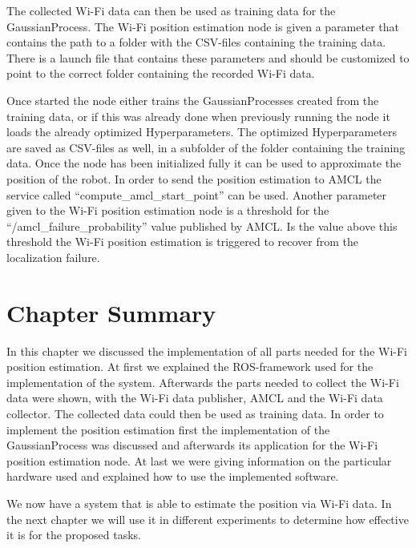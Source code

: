 The collected Wi-Fi data can then be used as training data for the \Gls{GaussianProcess}. The Wi-Fi position estimation node is given a parameter that contains the path to a folder with the CSV-files containing the training data. There is a launch file that contains these parameters and should be customized to point to the correct folder containing the recorded Wi-Fi data.

Once started the node either trains the \Gls{GaussianProcess}es created from the training data, or if this was already done when previously running the node it loads the already optimized \gls{Hyperparameter}s. The optimized \gls{Hyperparameter}s are saved as CSV-files as well, in a subfolder of the folder containing the training data. Once the node has been initialized fully it can be used to approximate the position of the robot. In order to send the position estimation to AMCL the service called ``compute\_amcl\_start\_point'' can be used. Another parameter given to the Wi-Fi position estimation node is a threshold for the ``/amcl\_failure\_probability'' value published by AMCL. Is the value above this threshold the Wi-Fi position estimation is triggered to recover from the localization failure. 

\section{Chapter Summary}
In this chapter we discussed the implementation of all parts needed for the Wi-Fi position estimation. At first we explained the ROS-framework used for the implementation of the system. Afterwards the parts needed to collect the Wi-Fi data were shown, with the Wi-Fi data publisher, AMCL and the Wi-Fi data collector. The collected data could then be used as training data. In order to implement the position estimation first the implementation of the \Gls{GaussianProcess} was discussed and afterwards its application for the Wi-Fi position estimation node. At last we were giving information on the particular hardware used and explained how to use the implemented software. 

We now have a system that is able to estimate the position via Wi-Fi data. In the next chapter we will use it in different experiments to determine how effective it is for the proposed tasks. 